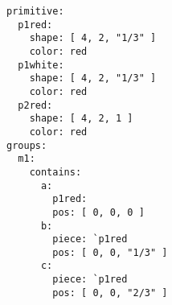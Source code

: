 \par\begin{minipage}{60ex}
\begin{verbatim}
primitive:
  p1red:
    shape: [ 4, 2, "1/3" ]
    color: red
  p1white:
    shape: [ 4, 2, "1/3" ]
    color: red
  p2red:
    shape: [ 4, 2, 1 ]
    color: red
groups:
  m1:
    contains:
      a:
        p1red:
        pos: [ 0, 0, 0 ]
      b:
        piece: `p1red
        pos: [ 0, 0, "1/3" ]
      c:
        piece: `p1red
        pos: [ 0, 0, "2/3" ]

\end{verbatim}
\end{minipage}\par